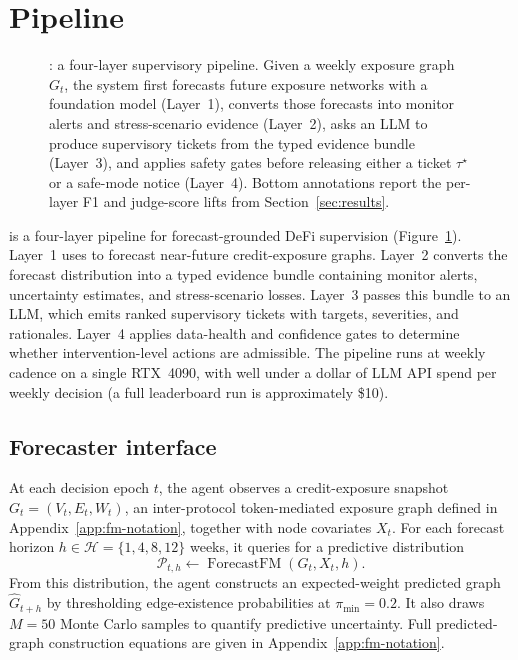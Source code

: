 \section{Pipeline}
\label{sec:pipeline}

\begin{figure}[t]
\centering
\resizebox{0.95\textwidth}{!}{}
\caption{\sysname{}: a four-layer supervisory pipeline. Given a weekly
exposure graph $G_t$, the system first forecasts future exposure networks
with a foundation model (Layer~1), converts those forecasts into monitor
alerts and stress-scenario evidence (Layer~2), asks an LLM to produce
supervisory tickets from the typed evidence bundle (Layer~3), and applies
safety gates before releasing either a ticket $\tau^{\star}$ or a safe-mode
notice (Layer~4). Bottom annotations report the per-layer F1 and judge-score
lifts from Section~\ref{sec:results}.}
\label{fig:system}
\end{figure}

\sysname{} is a four-layer pipeline for forecast-grounded DeFi supervision
(Figure~\ref{fig:system}). Layer~1 uses \fmname{} to forecast near-future
credit-exposure graphs. Layer~2 converts the forecast distribution into a
typed evidence bundle containing monitor alerts, uncertainty estimates, and
stress-scenario losses. Layer~3 passes this bundle to an LLM, which emits
ranked supervisory tickets with targets, severities, and rationales. Layer~4
applies data-health and confidence gates to determine whether
intervention-level actions are admissible. The pipeline runs at weekly
cadence on a single RTX~4090, with well under a dollar of LLM API spend
per weekly decision (a full \benchname{} leaderboard run is
approximately \$10).

\subsection{Forecaster interface}
\label{ssec:forecaster}

At each decision epoch $t$, the agent observes a credit-exposure snapshot
$G_t=(V_t,E_t,W_t)$, an inter-protocol token-mediated exposure graph defined
in Appendix~\ref{app:fm-notation}, together with node covariates $X_t$. For
each forecast horizon $h\in\mathcal{H}=\{1,4,8,12\}$ weeks, it queries
\fmname{} for a predictive distribution
\begin{equation}
\mathcal{P}_{t,h}
\leftarrow
\operatorname{ForecastFM}(G_t,X_t,h).
\end{equation}
From this distribution, the agent constructs an expected-weight predicted
graph $\widehat{G}_{t+h}$ by thresholding edge-existence probabilities at
$\pi_{\min}=0.2$. It also draws $M=50$ Monte Carlo samples to quantify
predictive uncertainty. Full predicted-graph construction equations are
given in Appendix~\ref{app:fm-notation}.

